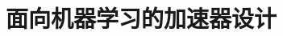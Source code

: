 \documentclass[../../main.tex]{subfiles}
\begin{document}
\chapter{面向机器学习的加速器设计}
\label{ch:08-ai-accelerator}






\end{document}
